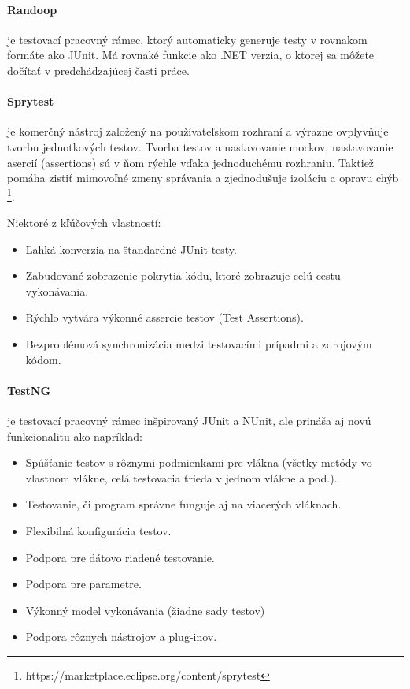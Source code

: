 \documentclass[11pt,twoside,slovak,a4paper]{article}
\begin{document}
	\paragraph{Randoop} je testovací pracovný rámec, ktorý automaticky generuje testy v rovnakom formáte ako JUnit. Má rovnaké funkcie ako .NET verzia, o ktorej sa môžete dočítať v predchádzajúcej časti práce.
	
	\paragraph{Sprytest} je komerčný nástroj založený na používateľskom rozhraní a výrazne ovplyvňuje tvorbu jednotkových testov. Tvorba testov a nastavovanie mockov, nastavovanie asercií (assertions) sú v ňom rýchle vďaka jednoduchému rozhraniu. Taktiež pomáha zistiť mimovoľné zmeny správania a zjednodušuje izoláciu a opravu chýb \footnote{https://marketplace.eclipse.org/content/sprytest}.
	
	Niektoré z kľúčových vlastností:
	\begin{itemize}
		\item Ľahká konverzia na štandardné JUnit testy.
		\item Zabudované zobrazenie pokrytia kódu, ktoré zobrazuje celú cestu vykonávania.
		\item Rýchlo vytvára výkonné assercie testov (Test Assertions).
		\item Bezproblémová synchronizácia medzi testovacími prípadmi a zdrojovým kódom.
	\end{itemize}
	
	\paragraph{TestNG} je testovací pracovný rámec inšpirovaný JUnit a NUnit, ale prináša aj novú funkcionalitu ako napríklad:
	\begin{itemize}
		\item Spúšťanie testov s rôznymi podmienkami pre vlákna (všetky metódy vo vlastnom vlákne, celá testovacia trieda v jednom vlákne a pod.).
		\item Testovanie, či program správne funguje aj na viacerých vláknach.
		\item Flexibilná konfigurácia testov.
		\item Podpora pre dátovo riadené testovanie.
		\item Podpora pre parametre.
		\item Výkonný model vykonávania (žiadne sady testov)
		\item Podpora rôznych nástrojov a plug-inov.
	\end{itemize}
	
\end{document}
